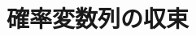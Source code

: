 \documentclass[a4j,11pt]{jarticle}
\theoremstyle{definition}
\newtheorem{lemma}[theorem]{補題}
\begin{document}
\section{確率変数列の収束}
\begin{comment} %
\begin{lemma}
  確率変数列列
  $(X_n)_{n=1}^{\infty}$
  が
  確率変数
  $X$
  に法則収束することと,\ 分布関数列
  $(F_{X_n})_{n=1}^{\infty}$
  が
  $F_X$
  に各点収束することは同値である.\ 
\end{lemma}
\begin{proof}
  (1)必要性

  $(X_n)_{n=1}^{\infty}$
  が
  $X$
  に法則収束すると仮定する.\ 
  $\mathbb{E}[f(X)] = \int_{\mathbb{R}}f(x) P_X(dx)$
  となるので,\ 
  $\lim_{n\to\infty} \int_{\mathbb{R}} f(x) P_{X_n}(dx) = \int_{\mathbb{R}} f(x) P_X(dx)$
  となる.\ 
  $A \in \mathcal{O}(\mathbb{R})$
  とすると,\ 
  $g_k \in C_b(\mathbb{R}) \nearrow 1_A$
  となる関数列
  $(g_k)_{k=1}^{\infty}$
  が存在する.\ 
  $\int_{\mathbb{R}} 1_A(x) P_{X_n}(dx) = P_{X_n}(A) \geq \int_{\mathbb{R}} g_k(x) P_{X_n}(dx)$
  なので,\ 仮定より
  $\liminf_{n\to\infty} P_{X_n}(dx) \geq \liminf_{n\to\infty} \int_{\mathbb{R}} g_k(x) P_{X_n}(dx) = \int_{\mathbb{R}} g_k(x) P_X(dx)$
  が成り立つ.\ 
  単調収束定理より
  $\lim_{k\to\infty} \int_{\mathbb{R}} g_k(x) P_X(dx) = \int_\mathbb{R} 1_A(x)P_X(dx) = P(A)$
  が成り立つので,\ 
  \begin{equation} \label{eq:inf}
    \liminf_{n\to\infty} P_{X_n}(A) \geq P(A)
  \end{equation}
  となる.\ 
  また,\ 
  $B = A^c$
  とすると,\ 
  $\limsup_{n\to\infty} P_{X_n}(B) = \limsup_{n\to\infty} 1-P_{X_n}(A) = 1 - \liminf_{n\to\infty}P_{X_n}(A) \leq 1 - P_X(A) = P_X(B)$
  が成り立つ.\ 
  よって,\ 任意の
  $B \in \mathcal{O}(\mathbb{R})^c$
  に対し,\ 
  \begin{equation} \label{eq:inf}
    \limsup_{n\to\infty} P_{X_n}(B) \leq P_X(B)
  \end{equation}
  となることがわかる.\ 
  以上より,\ 任意の
  $t \in \mathbb{R}$
  に対し,\ 
  \begin{align}
    \limsup_{n\to\infty} F_{X_n}(t) \\
    & = \limsup_{n\to\infty} P_{X_n}((-\infty, t]) 
    & \leq P_X((-\infty, t]) \\
    & = F_X(t) \\
    & = P_X
  \end{align}%
  $\lim_{n\to\infty} \int_{\mathbb{R}} 1_A(x) P_{X_n}(dx) = \lim_{n\to\infty} P_{X_n}(A)$,
  $\int_{\mathbb{R}} 1_A(x) P_X(dx) = P_X(A)$
  となる.\ 
  よって,\ 
  $\lim_{n\to\infty} P_{X_n}(A) = P_X(A)$
  であるので,\ 
  $\lim_{n\to\infty} F_{X_n} = F_X$
  とわかる.\ 


\end{comment}
\end{document}
